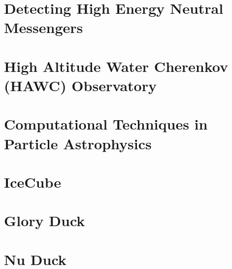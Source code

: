\documentclass[PhD]{msu-thesis}
\begin{document}
\chapter{Detecting High Energy Neutral Messengers\label{sec:multmessenger}}


\chapter{High Altitude Water Cherenkov (HAWC) Observatory\label{sec:hawc}}


\chapter{Computational Techniques in Particle Astrophysics}


\chapter{IceCube\label{sec:ice3}}


\chapter{Glory Duck\label{sec:glory_duck}}

\chapter{Nu Duck\label{sec:nu_duck}}

\end{document}
